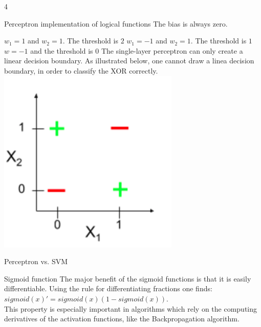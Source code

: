 \documentclass{article}
\begin{document}
    \begin{ukon-infie}[22.11.17]{4}

        \begin{exercise}[p=11]{Perceptron implementation of logical functions}
        The bias is always zero.
        
        	\question{}
        	{ $w_1 = 1$ and $w_2 = 1$. The threshold is $2$}
        	\question{}
        	{$w_1 = -1$ and $w_2 = 1$. The threshold is $1$}
        	\question{}
        	{$w = -1$ and the threshold is $0$}
        	\question{}
        	{
        	The single-layer perceptron can only create a linear decision boundary. As illustrated below, one cannot draw a linea decision boundary, in order to classify the XOR correctly.\\
        	\includegraphics[scale=0.5]{perceptron_XOR}
        	}
		
		\end{exercise}
		
		\begin{exercise}[p=4]{Perceptron vs. SVM}
		
		
		\end{exercise}
		
		\begin{exercise}[p=2]{Sigmoid function}
			The major benefit of the sigmoid functions is that it is easily differentiable. Using the rule for differentiating fractions one finds:\\
			$sigmoid(x)' = sigmoid(x)(1- sigmoid(x))$.\\
			This property is especially important in algorithms which rely on the computing derivatives of the activation functions, like the Backpropagation algorithm.
		\end{exercise}
		

\end{ukon-infie}
\end{document}
